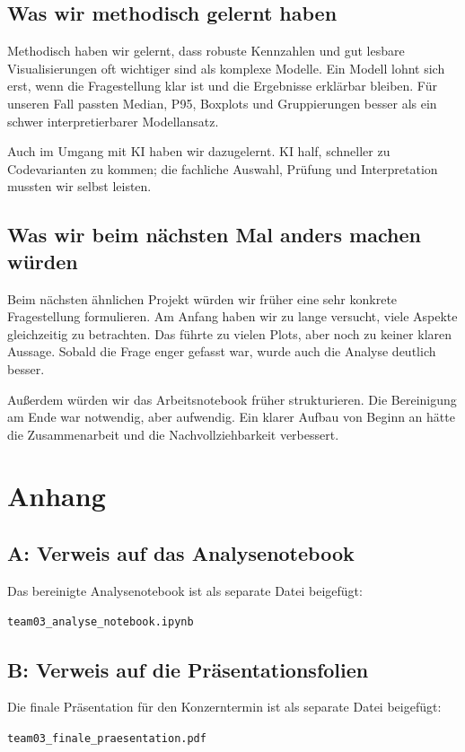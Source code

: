 \documentclass[a4paper, 11pt]{article}
\begin{document}
\subsection{Was wir methodisch gelernt haben}

Methodisch haben wir gelernt, dass robuste Kennzahlen und gut lesbare Visualisierungen oft wichtiger sind als komplexe Modelle. Ein Modell lohnt sich erst, wenn die Fragestellung klar ist und die Ergebnisse erklärbar bleiben. Für unseren Fall passten Median, P95, Boxplots und Gruppierungen besser als ein schwer interpretierbarer Modellansatz.

Auch im Umgang mit KI haben wir dazugelernt. KI half, schneller zu Codevarianten zu kommen; die fachliche Auswahl, Prüfung und Interpretation mussten wir selbst leisten.

\subsection{Was wir beim nächsten Mal anders machen würden}

Beim nächsten ähnlichen Projekt würden wir früher eine sehr konkrete Fragestellung formulieren. Am Anfang haben wir zu lange versucht, viele Aspekte gleichzeitig zu betrachten. Das führte zu vielen Plots, aber noch zu keiner klaren Aussage. Sobald die Frage enger gefasst war, wurde auch die Analyse deutlich besser.

Außerdem würden wir das Arbeitsnotebook früher strukturieren. Die Bereinigung am Ende war notwendig, aber aufwendig. Ein klarer Aufbau von Beginn an hätte die Zusammenarbeit und die Nachvollziehbarkeit verbessert.

\section*{Anhang}

\subsection*{A: Verweis auf das Analysenotebook}

Das bereinigte Analysenotebook ist als separate Datei beigefügt:

\begin{center}
\texttt{team03\_analyse\_notebook.ipynb}
\end{center}

\subsection*{B: Verweis auf die Präsentationsfolien}

Die finale Präsentation für den Konzerntermin ist als separate Datei beigefügt:

\begin{center}
\texttt{team03\_finale\_praesentation.pdf}
\end{center}
\end{document}
